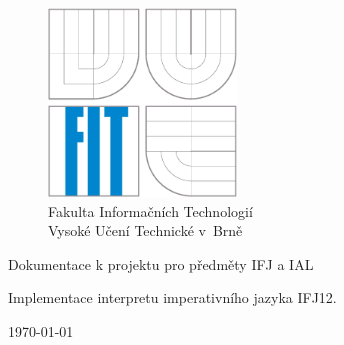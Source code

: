 \begin{titlepage}

\begin{figure}[!h]
  \centering
  \includegraphics[height=5cm]{img/logo.eps} \\
  Fakulta Informačních Technologií \\
  Vysoké Učení Technické v~Brně
\end{figure}

\vfill

\begin{center}
\begin{Large}
Dokumentace k projektu pro předměty IFJ a IAL\\
\end{Large}
\bigskip
\begin{Huge}
Implementace interpretu imperativního jazyka IFJ12.\\
\end{Huge}
\end{center}

\vfill

\begin{center}
\begin{Large}
\today
\end{Large}
\end{center}

\vfill


\end{titlepage}
